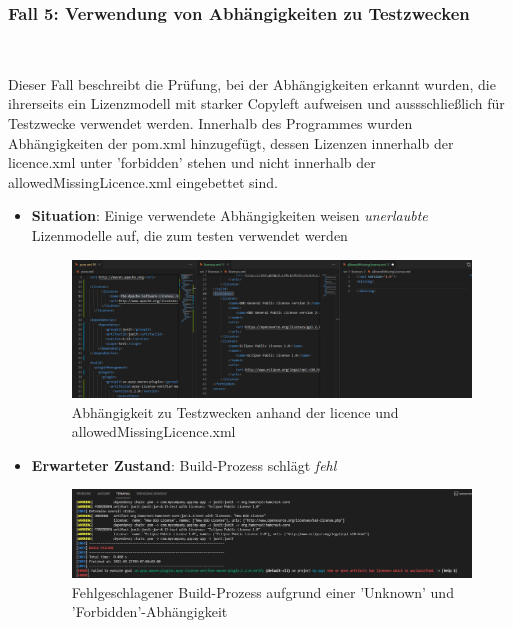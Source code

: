 \subsubsection{Fall 5: Verwendung von Abhängigkeiten zu Testzwecken} $~$

Dieser Fall beschreibt die Prüfung, bei der Abhängigkeiten erkannt wurden, die ihrerseits ein Lizenzmodell mit starker Copyleft aufweisen und aussschließlich für Testzwecke verwendet werden. Innerhalb des Programmes wurden Abhängigkeiten der pom.xml hinzugefügt, dessen Lizenzen innerhalb der licence.xml unter 'forbidden' stehen und nicht innerhalb der allowedMissingLicence.xml eingebettet sind. 

\begin{itemize}
    \item \textbf{Situation}: Einige verwendete Abhängigkeiten weisen \textit{unerlaubte} Lizenmodelle auf, die zum testen verwendet werden
    
    \begin{figure}[h]
        \centering
        \includegraphics[scale=0.37]{Bilder/Fall5Situation.png}
        \caption{Abhängigkeit zu Testzwecken anhand der licence und allowedMissingLicence.xml}
    \end{figure}

    \item \textbf{Erwarteter Zustand}: Build-Prozess schlägt \textit{fehl} 

    \begin{figure}[h]
        \centering
        \includegraphics[scale=0.4]{Bilder/Fall5Zustand.png}
        \caption{Fehlgeschlagener Build-Prozess aufgrund einer 'Unknown' und 'Forbidden'-Abhängigkeit}
    \end{figure}


\end{itemize}
